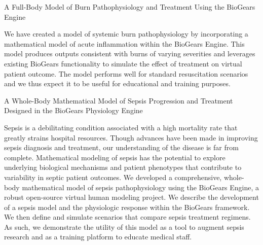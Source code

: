 
\begin{refsection}
    \nocite{baird2021detecting}

	\newrefcontext[sorting=nyt]
	\printbibliography[heading=none]
\end{refsection}


  \cventry
    {A Full-Body Model of Burn Pathophysiology and Treatment Using the BioGears Engine} %
    {} %
    {} %
    {} %
     {
    \begin{cvitems} %
    \item {We have created a model of systemic burn pathophysiology by incorporating a mathematical model of acute inflammation within the BioGears Engine. This model produces outputs consistent with burns of varying severities and leverages existing BioGears functionality to simulate the effect of treatment on virtual patient outcome. The model performs well for standard resuscitation scenarios and we thus expect it to be useful for educational and training purposes.}
    \end{cvitems}
     }

  \cventry
    {A Whole-Body Mathematical Model of Sepsis Progression and Treatment Designed in the BioGears Physiology Engine} %
    {} %
    {} %
    {} %
     {
    \begin{cvitems} %
    \item {Sepsis is a debilitating condition associated with a high mortality rate that greatly strains hospital resources. Though advances have been made in improving sepsis diagnosis and treatment, our understanding of the disease is far from complete. Mathematical modeling of sepsis has the potential to explore underlying biological mechanisms and patient phenotypes that contribute to variability in septic patient outcomes. We developed a comprehensive, whole-body mathematical model of sepsis pathophysiology using the BioGears Engine, a robust open-source virtual human modeling project. We describe the development of a sepsis model and the physiologic response within the BioGears framework. We then define and simulate scenarios that compare sepsis treatment regimens. As such, we demonstrate the utility of this model as a tool to augment sepsis research and as a training platform to educate medical staff.}
    \end{cvitems}
     }

